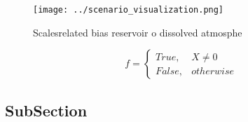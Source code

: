 \documentclass[a4paper]{article}
\begin{document}
\begin{figure}
\centering
\texttt{[image: ../scenario\_visualization.png]}
\caption{Scalesrelated bias reservoir o dissolved atmosphe
}
\end{figure}
 
\begin{equation}   f =
\begin{cases} True, & X \neq 0\\
False, & otherwise
\end{cases}
\end{equation}

\subsection{SubSection}
\end{document}
